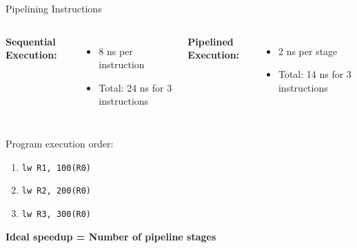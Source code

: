 \documentclass[aspectratio=169,12pt]{beamer}
\begin{document}
\begin{frame}{Pipelining Instructions}
    \begin{columns}
        \textbf{Sequential Execution:}
        \begin{itemize}
            \item 8 ns per instruction
            \item Total: 24 ns for 3 instructions
        \end{itemize}
        
        \textbf{Pipelined Execution:}
        \begin{itemize}
            \item 2 ns per stage
            \item Total: 14 ns for 3 instructions
        \end{itemize}
    \end{columns}
    
    \vspace{0.5cm}
    \centering
    Program execution order:
    \begin{enumerate}
        \item \texttt{lw R1, 100(R0)}
        \item \texttt{lw R2, 200(R0)}
        \item \texttt{lw R3, 300(R0)}
    \end{enumerate}
    
    \textbf{Ideal speedup = Number of pipeline stages}
\end{frame}
\end{document}
